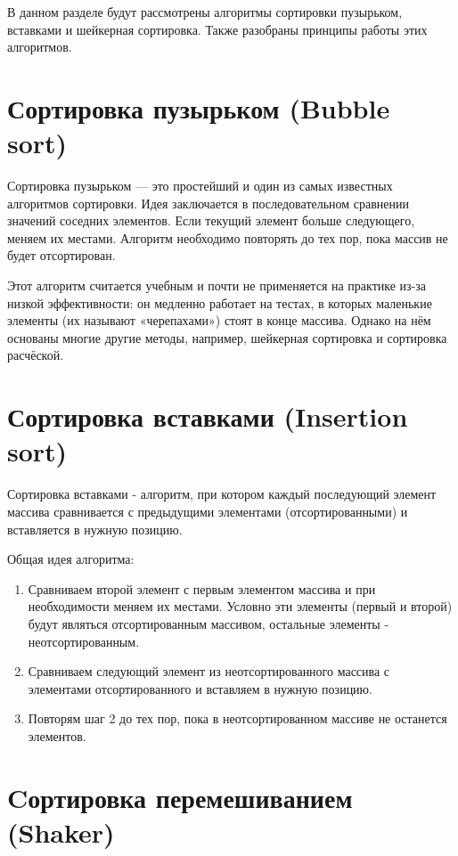 \documentclass[12pt,a4paper]{report}
\begin{document}
В данном разделе будут рассмотрены алгоритмы сортировки пузырьком, вставками и шейкерная сортировка.
Также разобраны принципы работы этих алгоритмов.

\section{Сортировка пузырьком (Bubble sort)}

Сортировка пузырьком — это простейший и один из самых известных
 алгоритмов сортировки. Идея заключается в последовательном 
 сравнении значений соседних элементов. Если текущий элемент 
 больше следующего, меняем их местами. Алгоритм необходимо 
 повторять до тех пор, пока массив не будет отсортирован.

 Этот алгоритм считается учебным и почти не применяется на
  практике из-за низкой эффективности: он медленно работает 
  на тестах, в которых маленькие элементы (их называют 
  «черепахами») стоят в конце массива. Однако на нём основаны 
  многие другие методы, например, шейкерная сортировка и 
  сортировка расчёской.

\section{Сортировка вставками (Insertion sort)}

Сортировка вставками - алгоритм, при котором каждый последующий
 элемент массива сравнивается с предыдущими элементами 
 (отсортированными) и вставляется в нужную позицию.

Общая идея алгоритма:

\begin{enumerate}
    \item Сравниваем второй элемент с первым элементом массива и 
    при необходимости меняем их местами. Условно эти элементы 
    (первый и второй) будут являться отсортированным массивом,
     остальные элементы - неотсортированным.
    \item  Сравниваем следующий элемент из неотсортированного массива 
    с элементами отсортированного и вставляем в нужную позицию.
    \item Повторям шаг 2 до тех пор, пока в неотсортированном массиве 
    не останется элементов.
\end{enumerate}


\section{Cортировка перемешиванием (Shaker)}
\end{document}
